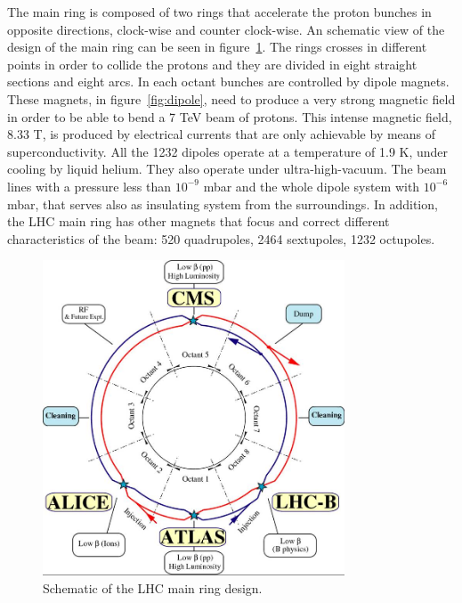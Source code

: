 The main ring is composed of two rings that accelerate the proton bunches in opposite directions, clock-wise and counter clock-wise. An schematic view of the design of the main ring can be seen in figure~\ref{fig:schematic}. The rings crosses in different points in order to collide the protons and they are divided in eight straight sections and eight arcs. In each octant bunches are controlled by dipole magnets. These magnets, in figure~\ref{fig:dipole}, need to produce a very strong magnetic field in order to be able to bend a 7 TeV beam of protons. This intense magnetic field, 8.33 T, is produced by electrical currents that are only achievable by means of superconductivity. All the 1232 dipoles operate at a temperature of 1.9 K, under cooling by liquid helium. They also operate under ultra-high-vacuum. The beam lines with a pressure less than $10^{-9}$ mbar and the whole dipole system with $10^{-6}$ mbar, that serves also as insulating system from the surroundings. In addition, the LHC main ring has other magnets that focus and correct different characteristics of the beam: 520 quadrupoles, 2464 sextupoles, 1232 octupoles. 

\begin{figure}[!Hhtbp]
  \begin{center}
    \includegraphics[width=0.8\textwidth]{figs/lhc-schematic.jpg}
    \caption{Schematic of the LHC main ring design.}
    \label{fig:schematic}
  \end{center}
\end{figure}

